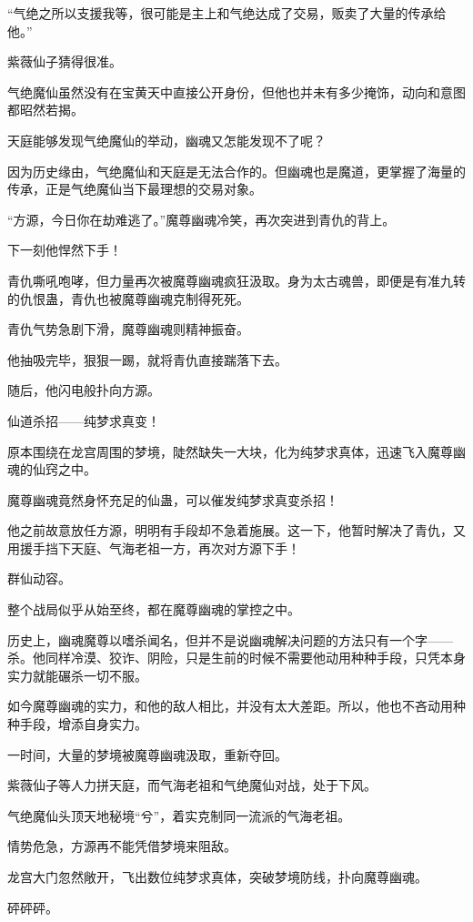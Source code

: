 \begin{this_body}
“气绝之所以支援我等，很可能是主上和气绝达成了交易，贩卖了大量的传承给他。”

紫薇仙子猜得很准。

气绝魔仙虽然没有在宝黄天中直接公开身份，但他也并未有多少掩饰，动向和意图都昭然若揭。

天庭能够发现气绝魔仙的举动，幽魂又怎能发现不了呢？

因为历史缘由，气绝魔仙和天庭是无法合作的。但幽魂也是魔道，更掌握了海量的传承，正是气绝魔仙当下最理想的交易对象。

“方源，今日你在劫难逃了。”魔尊幽魂冷笑，再次突进到青仇的背上。

下一刻他悍然下手！

青仇嘶吼咆哮，但力量再次被魔尊幽魂疯狂汲取。身为太古魂兽，即便是有准九转的仇恨蛊，青仇也被魔尊幽魂克制得死死。

青仇气势急剧下滑，魔尊幽魂则精神振奋。

他抽吸完毕，狠狠一踢，就将青仇直接踹落下去。

随后，他闪电般扑向方源。

仙道杀招——纯梦求真变！

原本围绕在龙宫周围的梦境，陡然缺失一大块，化为纯梦求真体，迅速飞入魔尊幽魂的仙窍之中。

魔尊幽魂竟然身怀充足的仙蛊，可以催发纯梦求真变杀招！

他之前故意放任方源，明明有手段却不急着施展。这一下，他暂时解决了青仇，又用援手挡下天庭、气海老祖一方，再次对方源下手！

群仙动容。

整个战局似乎从始至终，都在魔尊幽魂的掌控之中。

历史上，幽魂魔尊以嗜杀闻名，但并不是说幽魂解决问题的方法只有一个字——杀。他同样冷漠、狡诈、阴险，只是生前的时候不需要他动用种种手段，只凭本身实力就能碾杀一切不服。

如今魔尊幽魂的实力，和他的敌人相比，并没有太大差距。所以，他也不吝动用种种手段，增添自身实力。

一时间，大量的梦境被魔尊幽魂汲取，重新夺回。

紫薇仙子等人力拼天庭，而气海老祖和气绝魔仙对战，处于下风。

气绝魔仙头顶天地秘境“兮”，着实克制同一流派的气海老祖。

情势危急，方源再不能凭借梦境来阻敌。

龙宫大门忽然敞开，飞出数位纯梦求真体，突破梦境防线，扑向魔尊幽魂。

砰砰砰。


\end{this_body}
